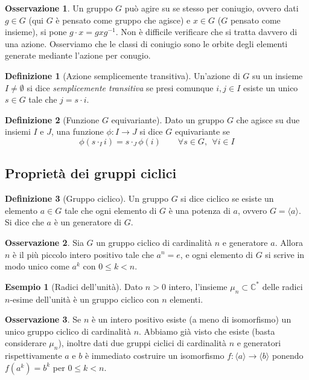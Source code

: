 \documentclass[11pt]{article}
\theoremstyle{plain}
\theoremstyle{definition}
\newtheorem{defn}{Definizione}[section]
\newtheorem{exmp}{Esempio}[section]
\newtheorem*{rem}{Osservazione}
\theoremstyle{remark}
\newcommand{\C}{\mathbb{C}}
\begin{document}
\begin{rem}
	Un gruppo $G$ può agire su se stesso per coniugio, ovvero dati $g\in G$ (qui $G$ è pensato come gruppo che agisce) e $x\in G$ ($G$ pensato come insieme),
	si pone $g\cdot x = gxg^{-1}$. Non è difficile verificare che si tratta davvero di una azione.
	Osserviamo che le classi di coniugio sono le orbite degli elementi generate mediante l'azione per conugio.
\end{rem}




\begin{defn}[Azione semplicemente transitiva]
Un'azione di $G$ su un insieme $I\neq \emptyset$ si dice \textit{semplicemente transitiva}
se presi comunque $i,j\in I$ esiste un unico $s\in G$ tale che $j=s\cdot i$.
\end{defn}


\begin{defn}[Funzione $G$ equivariante]
Dato un gruppo $G$ che agisce su due insiemi $I$ e $J$, una funzione $\phi: I \to J$ si dice $G$ equivariante se
\[ \phi(s \cdot_I i) = s \cdot_J \phi(i) \qquad \forall s \in G, \ \ \forall i \in I \]
\end{defn}





\newpage
\subsection{Proprietà dei gruppi ciclici}

\begin{defn}[Gruppo ciclico] Un gruppo $G$ si dice ciclico se esiste un elemento $a\in G$ tale che ogni
elemento di $G$ è una potenza di $a$, ovvero $G=\langle a\rangle$. Si dice che $a$ è un generatore di $G$.
\end{defn}

\begin{rem}
Sia $G$ un gruppo ciclico di cardinalità $n$ e generatore $a$. Allora $n$ è il più piccolo intero positivo tale che $a^n = e$,
e ogni elemento di $G$ si scrive in modo unico come $a^k$ con $0\le k < n$.
\end{rem}

\begin{exmp}[Radici dell'unità]
Dato $n>0$ intero, l'insieme $\mu_n\subset \C^*$ delle radici $n$-esime dell'unità è un gruppo ciclico con $n$ elementi.
\end{exmp}

\begin{rem} Se $n$ è un intero positivo esiste (a meno di isomorfismo) un unico gruppo ciclico di cardinalità $n$.
Abbiamo già visto che esiste (basta considerare $\mu_n$),
inoltre dati due gruppi ciclici di cardinalità $n$ e generatori rispettivamente $a$ e $b$ è immediato costruire un
isomorfismo $f:\langle a\rangle\to\langle b\rangle$ ponendo $f(a^k) = b^k$ per $0\le k < n$.
\end{rem}
\end{document}
